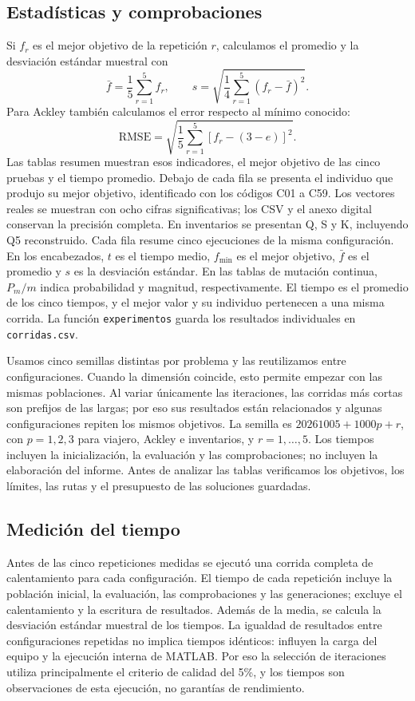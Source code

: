 \documentclass[conference]{IEEEtran}
\begin{document}
\subsection{Estadísticas y comprobaciones}
Si $f_r$ es el mejor objetivo de la repetición $r$, calculamos el promedio y la desviación estándar muestral con
\begin{equation}
\bar f=\frac{1}{5}\sum_{r=1}^{5}f_r,\qquad
s=\sqrt{\frac{1}{4}\sum_{r=1}^{5}(f_r-\bar f)^2}.
\end{equation}
Para Ackley también calculamos el error respecto al mínimo conocido:
\begin{equation}
\mathrm{RMSE}=\sqrt{\frac{1}{5}\sum_{r=1}^{5}\left[f_r-(3-e)\right]^2}.
\end{equation}
Las tablas resumen muestran esos indicadores, el mejor objetivo de las cinco pruebas y el tiempo promedio. Debajo de cada fila se presenta el individuo que produjo su mejor objetivo, identificado con los códigos C01 a C59. Los vectores reales se muestran con ocho cifras significativas; los CSV y el anexo digital conservan la precisión completa. En inventarios se presentan Q, S y K, incluyendo Q5 reconstruido. Cada fila resume cinco ejecuciones de la misma configuración. En los encabezados, $t$ es el tiempo medio, $f_{\min}$ es el mejor objetivo, $\bar f$ es el promedio y $s$ es la desviación estándar. En las tablas de mutación continua, $P_m/m$ indica probabilidad y magnitud, respectivamente. El tiempo es el promedio de los cinco tiempos, y el mejor valor y su individuo pertenecen a una misma corrida. La función \texttt{experimentos} guarda los resultados individuales en \texttt{corridas.csv}.

Usamos cinco semillas distintas por problema y las reutilizamos entre configuraciones. Cuando la dimensión coincide, esto permite empezar con las mismas poblaciones. Al variar únicamente las iteraciones, las corridas más cortas son prefijos de las largas; por eso sus resultados están relacionados y algunas configuraciones repiten los mismos objetivos. La semilla es $20261005+1000p+r$, con $p=1,2,3$ para viajero, Ackley e inventarios, y $r=1,\ldots,5$. Los tiempos incluyen la inicialización, la evaluación y las comprobaciones; no incluyen la elaboración del informe. Antes de analizar las tablas verificamos los objetivos, los límites, las rutas y el presupuesto de las soluciones guardadas.


\subsection{Medición del tiempo}
Antes de las cinco repeticiones medidas se ejecutó una corrida completa de calentamiento para cada configuración. El tiempo de cada repetición incluye la población inicial, la evaluación, las comprobaciones y las generaciones; excluye el calentamiento y la escritura de resultados. Además de la media, se calcula la desviación estándar muestral de los tiempos. La igualdad de resultados entre configuraciones repetidas no implica tiempos idénticos: influyen la carga del equipo y la ejecución interna de MATLAB. Por eso la selección de iteraciones utiliza principalmente el criterio de calidad del 5\%, y los tiempos son observaciones de esta ejecución, no garantías de rendimiento.
\end{document}
